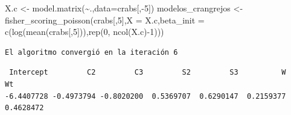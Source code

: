 \documentclass[
  letterpaper,
  DIV=11,
  numbers=noendperiod]{scrartcl}
\newenvironment{Shaded}{\begin{snugshade}}{\end{snugshade}}
\newcommand{\AttributeTok}[1]{\textcolor[rgb]{0.40,0.45,0.13}{#1}}
\newcommand{\DecValTok}[1]{\textcolor[rgb]{0.68,0.00,0.00}{#1}}
\newcommand{\FunctionTok}[1]{\textcolor[rgb]{0.28,0.35,0.67}{#1}}
\newcommand{\NormalTok}[1]{\textcolor[rgb]{0.00,0.23,0.31}{#1}}
\newcommand{\OtherTok}[1]{\textcolor[rgb]{0.00,0.23,0.31}{#1}}
\newcommand{\SpecialCharTok}[1]{\textcolor[rgb]{0.37,0.37,0.37}{#1}}
\newcommand{\StringTok}[1]{\textcolor[rgb]{0.13,0.47,0.30}{#1}}
\begin{document}
\begin{Shaded}
\begin{Highlighting}[]
\NormalTok{X.c }\OtherTok{\textless{}{-}} \FunctionTok{model.matrix}\NormalTok{(}\SpecialCharTok{\textasciitilde{}}\NormalTok{.,}\AttributeTok{data=}\NormalTok{crabs[,}\SpecialCharTok{{-}}\DecValTok{5}\NormalTok{])}
\NormalTok{modelos\_crangrejos }\OtherTok{\textless{}{-}} \FunctionTok{fisher\_scoring\_poisson}\NormalTok{(crabs[,}\DecValTok{5}\NormalTok{],}\AttributeTok{X =}\NormalTok{ X.c,}\AttributeTok{beta\_init =} \FunctionTok{c}\NormalTok{(}\FunctionTok{log}\NormalTok{(}\FunctionTok{mean}\NormalTok{(crabs[,}\DecValTok{5}\NormalTok{])),}\FunctionTok{rep}\NormalTok{(}\DecValTok{0}\NormalTok{, }\FunctionTok{ncol}\NormalTok{(X.c)}\SpecialCharTok{{-}}\DecValTok{1}\NormalTok{)))}
\end{Highlighting}
\end{Shaded}

\begin{verbatim}
El algoritmo convergió en la iteración 6
\end{verbatim}

\begin{Shaded}
\end{Shaded}

\begin{verbatim}
 Intercept         C2         C3         S2         S3          W         Wt 
-6.4407728 -0.4973794 -0.8020200  0.5369707  0.6290147  0.2159377  0.4628472 
\end{verbatim}

\begin{Shaded}
\end{Shaded}
\end{document}
